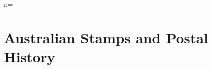 \documentclass[justified]{tufte-book}
\begin{document}
{{\begin{minipage}{1.05\textwidth}
\def\prefix{australia}%

\if@one {}\fi%
%
\if@two%
  \hspace{0pt}
\fi%
\if@three%
  \imagerowseparator
\fi
\if@four%
 \imagerowseparator
\fi
\if@five%
   \imagerowseparator
\fi
\if@six%
   \imagerowseparator
\fi
\if@seven%
   \imagerowseparator
   \imagerowseparator
\fi
\if@eight%
   \imagerowseparator
   \imagerowseparator
\fi
\if@nine%
   \imagerowseparator
   \imagerowseparator
\fi
\end{minipage}}


\par
\noindent
\if@other
\begin{minipage}{\textwidth}
\def\prefix{australia}%
\setcounter{ct}{0}%
\@for \i:=\@templist{}
\end{minipage}
\fi
\medskip
}%



\chapter{Australian Stamps and Postal History}
\end{document}
